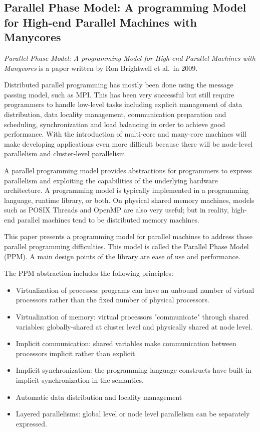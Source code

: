 \subsection{Parallel Phase Model: A programming Model for High-end Parallel Machines with Manycores}

\emph{Parallel Phase Model: A programming Model for High-end Parallel Machines
with Manycores} \cite{BrightwellParallelPhaseModel} is a paper written by
Ron Brightwell et al.\ in 2009.

Distributed parallel programming has mostly been done using the message passing
model, such as MPI\@. This has been very successful but still require programmers
to handle low-level tasks including explicit management of data distribution,
data locality management, communication preparation and scheduling,
synchronization and load balancing in order to achieve good performance.
With the introduction of multi-core and many-core machines will make developing
applications even more difficult because there will be node-level parallelism
and cluster-level parallelism.

A parallel programming model provides abstractions for programmers to express
parallelism and exploiting the capabilities of the underlying hardware
architecture. A programming model is typically implemented in a programming
language, runtime library, or both. On physical shared memory machines, models
such as POSIX Threads and OpenMP are also very useful; but in reality, high-end
parallel machines tend to be distributed memory machines.

This paper presents a programming model for parallel machines to address those
parallel programming difficulties. This model is called the Parallel Phase
Model (PPM). A main design points of the library are ease of use and
performance.

The PPM abstraction includes the following principles:

\begin{itemize}
	\item Virtualization of processes: programs can have an unbound number of
		virtual processors rather than the fixed number of physical processors.

	\item Virtualization of memory: virtual processors "communicate" through
		shared variables: globally-shared at cluster level and physically
		shared at node level.

	\item Implicit communication: shared variables make communication between
		processors implicit rather than explicit.

	\item Implicit synchronization: the programming language constructs have
		built-in implicit synchronization in the semantics.

	\item Automatic data distribution and locality management

	\item Layered parallelisms: global level or node level parallelism can be
		separately expressed.
\end{itemize}

